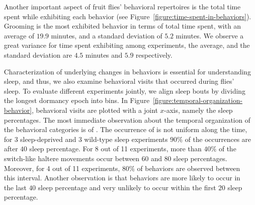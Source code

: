 Another important aspect of fruit flies' behavioral repertoires is the total time spent while exhibiting each behavior (see Figure~\ref{figure:time-spent-in-behaviors}).
Grooming is the most exhibited behavior in terms of total time spent, with an average of $19.9$ minutes, and a standard deviation of $5.2$ minutes.
We observe a great variance for time spent exhibiting \HaltereSwitch among experiments, the average, and the standard deviation are $4.5$ minutes and $5.9$ respectively.

Characterization of underlying changes in behaviors is essential for understanding sleep, and thus, we also examine behavioral visits that occurred during flies' sleep.
To evaluate different experiments jointly, we align sleep bouts by dividing the longest dormancy epoch into bins.
In Figure~\ref{figure:temporal-organization-behavior}, behavioral visits are plotted with a joint $x$-axis, namely the sleep percentages.
The most immediate observation about the temporal organization of the behavioral categories is of \HaltereSwitch.
The occurrence of \HaltereSwitch is not uniform along the time, for 3 sleep-deprived and 3 wild-type sleep experiments $90\%$ of the \HaltereSwitch occurrences are after $40$ sleep percentage.
For 8 out of 11 experiments, more than $40\%$ of the switch-like haltere movements occur between $60$ and $80$ sleep percentages.
Moreover, for 4 out of 11 experiments, $80\%$ of \HaltereSwitch behaviors are observed between this interval.
Another observation is that \Grooming behaviors are more likely to occur in the last $40$ sleep percentage and very unlikely to occur within the first $20$ sleep percentage.
